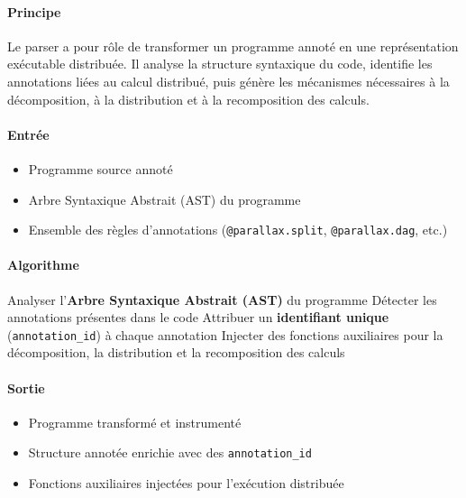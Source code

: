 \documentclass[12pt,a4paper]{report}
\theoremstyle{definition}
\begin{document}
\paragraph{Principe}
Le parser a pour rôle de transformer un programme annoté en une représentation exécutable distribuée. Il analyse la structure syntaxique du code, identifie les annotations liées au calcul distribué, puis génère les mécanismes nécessaires à la décomposition, à la distribution et à la recomposition des calculs.

\paragraph{Entrée}
\begin{itemize}
    \item[$\bullet$] Programme source annoté
    \item[$\bullet$] Arbre Syntaxique Abstrait (AST) du programme
    \item[$\bullet$] Ensemble des règles d’annotations (\texttt{@parallax.split}, \texttt{@parallax.dag}, etc.)
\end{itemize}

\paragraph{Algorithme}

\begin{algorithm}[H]
\caption{Fonctionnement général du parser}
\label{alg:parser}

\begin{algorithmic}[1]

\State Analyser l'\textbf{Arbre Syntaxique Abstrait (AST)} du programme
\State Détecter les annotations présentes dans le code
\State Attribuer un \textbf{identifiant unique} (\texttt{annotation\_id}) à chaque annotation
\State Injecter des fonctions auxiliaires pour la décomposition, la distribution et la recomposition des calculs

\end{algorithmic}
\end{algorithm}

\paragraph{Sortie}
\begin{itemize}
    \item [$\bullet$]Programme transformé et instrumenté
    \item[$\bullet$] Structure annotée enrichie avec des \texttt{annotation\_id}
    \item[$\bullet$] Fonctions auxiliaires injectées pour l’exécution distribuée
\end{itemize}
\end{document}
